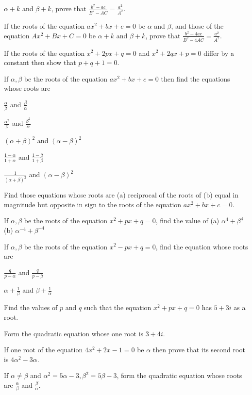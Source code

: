   $\alpha + k$ and $\beta + k$, prove that $\frac{b^2 - ac}{B^2 - AC} = \frac{a^2}{A^2}$.
\item If the roots of the equation $ax^2 + bx + c = 0$ be $\alpha$ and $\beta$, and those of the equation $Ax^2 + Bx + C = 0$ be
  $\alpha + k$ and $\beta + k$, prove that $\frac{b^2 - 4ac}{B^2 - 4AC} = \frac{a^2}{A^2}$.
\item If the roots of the equation $x^2 + 2px + q = 0$ and $x^2 + 2qx + p = 0$ differ by a constant then show that $p + q + 1 = 0$.
\item If $\alpha, \beta$ be the roots of the equation $ax^2 + bx + c = 0$ then find the equations whose roots are
  \startitemize[i]
  \item $\frac{\alpha}{\beta}$ and $\frac{\beta}{\alpha}$
  \item $\frac{\alpha^2}{\beta}$ and $\frac{\beta^2}{\alpha}$
  \item $(\alpha + \beta)^2$ and $(\alpha - \beta)^2$
  \item $\frac{1 - \alpha}{1 + \alpha}$ and $\frac{1 - \beta}{1 + \beta}$
  \item $\frac{1}{(\alpha + \beta)^2}$ and $(\alpha - \beta)^2$
  \stopitemize
\item Find those equations whose roots are (a) reciprocal of the roots of (b) equal in magnitude but opposite in sign to the roots
  of the equation $ax^2 + bx + c = 0$.
\item If $\alpha, \beta$ be the roots of the equation $x^2 + px + q = 0$, find the value of (a) $\alpha^4 + \beta^4$ (b)
  $\alpha^{-4} + \beta^{-4}$
\item If $\alpha, \beta$ be the roots of the equation $x^2 - px + q = 0$, find the equation whose roots are
  \startitemize[i]
  \item $\frac{q}{p - \alpha}$ and $\frac{q}{p - \beta}$
  \item $\alpha + \frac{1}{\beta}$ and $\beta + \frac{1}{\alpha}$
  \stopitemize
\item Find the values of $p$ and $q$ such that the equation $x^2 + px + q = 0$ has $5 + 3i$ as a root.
\item Form the quadratic equation whose one root is $3 + 4i$.
\item If one root of the equation $4x^2 + 2x - 1 = 0$ be $\alpha$ then prove that its second root is $4\alpha^2 - 3\alpha$.
\item If $\alpha \neq \beta$ and $\alpha^2 = 5\alpha -3, \beta^2 = 5\beta - 3$, form the quadratic equation whose roots are
  $\frac{\alpha}{\beta}$ and $\frac{\beta}{\alpha}$.

